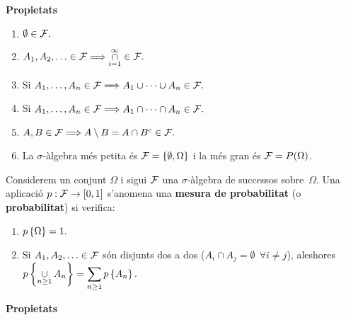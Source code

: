 \newpage

{\bf Propietats}

\begin{enumerate}

\item $\emptyset \in {\cal F}.$

\item $\displaystyle A_1, A_2, \ldots \in {\cal F} \Longrightarrow
\mathop{\cap}\limits_{i=1}^\infty \in {\cal F}.$

\item Si $A_1, \ldots , A_n \in {\cal F} \Longrightarrow A_1 \cup \cdots \cup
A_n \in {\cal F}.$

\item Si $A_1, \ldots , A_n \in {\cal F} \Longrightarrow A_1 \cap \cdots \cap
A_n \in {\cal F}.$

\item $A, B \in {\cal F} \Longrightarrow A \setminus B = A \cap B^c \in {\cal
F}.$

\item La $\sigma$-\`algebra m\'es petita \'es 
${\cal F} = \{ \emptyset, \Omega \}$ i
la m\'es gran \'es ${\cal F} = P(\Omega)$.

\end{enumerate}

\begin{defin}
Considerem un conjunt $\Omega$ i sigui ${\cal F}$ una $\sigma$-\`algebra 
de successos sobre~$\Omega$. Una
aplicaci\'o $p : {\cal F} \to [0,1] $ s'anomena una {\bf mesura de
probabilitat}
(o {\bf probabilitat}) si verifica:

\begin{enumerate}
\item $p\left\{\Omega\right\} = 1.$

\item Si $A_1, A_2, \ldots \in {\cal F}$ s\'on disjunts dos a dos ($A_i \cap A_j
=
\emptyset \ \ \forall i \not = j$), aleshores $\displaystyle 
p\left\{\mathop{\cup}\limits_{n \geq 1} A_n\right\} = \sum_{n \geq 1} p\left\{A_n\right\}.$

\end{enumerate}
\end{defin}

{\bf Propietats}

